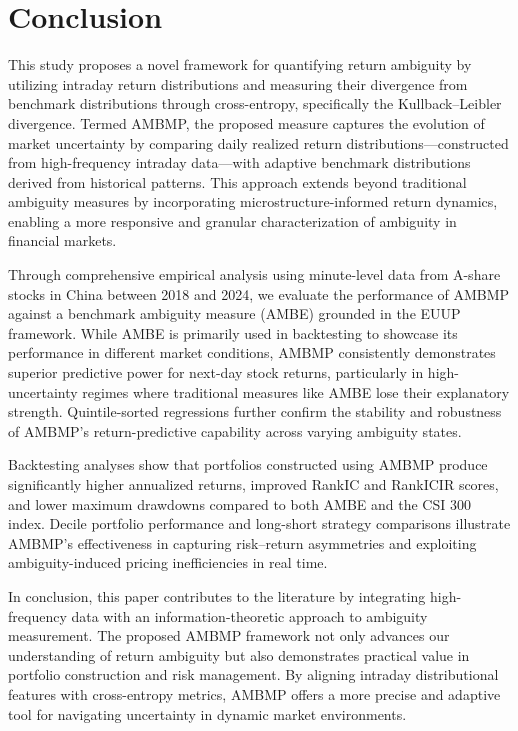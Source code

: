 \documentclass[preprint,12pt,authoryear]{elsarticle}
\begin{document}
\section{Conclusion}
This study proposes a novel framework for quantifying return ambiguity by utilizing intraday return distributions and measuring their divergence from benchmark distributions through cross-entropy, specifically the Kullback–Leibler divergence. Termed AMBMP, the proposed measure captures the evolution of market uncertainty by comparing daily realized return distributions—constructed from high-frequency intraday data—with adaptive benchmark distributions derived from historical patterns. This approach extends beyond traditional ambiguity measures by incorporating microstructure-informed return dynamics, enabling a more responsive and granular characterization of ambiguity in financial markets.

Through comprehensive empirical analysis using minute-level data from A-share stocks in China between 2018 and 2024, we evaluate the performance of AMBMP against a benchmark ambiguity measure (AMBE) grounded in the EUUP framework. While AMBE is primarily used in backtesting to showcase its performance in different market conditions, AMBMP consistently demonstrates superior predictive power for next-day stock returns, particularly in high-uncertainty regimes where traditional measures like AMBE lose their explanatory strength. Quintile-sorted regressions further confirm the stability and robustness of AMBMP's return-predictive capability across varying ambiguity states.

Backtesting analyses show that portfolios constructed using AMBMP produce significantly higher annualized returns, improved RankIC and RankICIR scores, and lower maximum drawdowns compared to both AMBE and the CSI 300 index. Decile portfolio performance and long-short strategy comparisons illustrate AMBMP’s effectiveness in capturing risk–return asymmetries and exploiting ambiguity-induced pricing inefficiencies in real time.

In conclusion, this paper contributes to the literature by integrating high-frequency data with an information-theoretic approach to ambiguity measurement. The proposed AMBMP framework not only advances our understanding of return ambiguity but also demonstrates practical value in portfolio construction and risk management. By aligning intraday distributional features with cross-entropy metrics, AMBMP offers a more precise and adaptive tool for navigating uncertainty in dynamic market environments.
 

\end{document}
